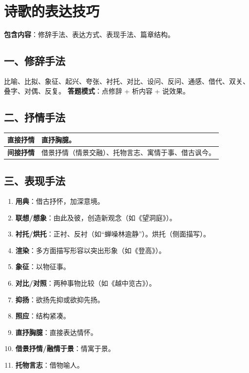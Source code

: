 \documentclass[11pt,a4paper]{article}
\begin{document}
\section{诗歌的表达技巧}

\textbf{包含内容}：修辞手法、表达方式、表现手法、篇章结构。

\subsection{一、修辞手法}
比喻、比拟、象征、起兴、夸张、衬托、对比、设问、反问、通感、借代、双关、叠字、对偶、反复。
\textbf{答题模式}：点修辞 + 析内容 + 说效果。

\subsection{二、抒情手法}
\begin{tcolorbox}[colback=white, colframe=black!50]
\begin{tabularx}{\textwidth}{@{}lX@{}}
\textbf{直接抒情} & 直抒胸臆。 \\ \midrule
\textbf{间接抒情} & 借景抒情（情景交融）、托物言志、寓情于事、借古讽今。 \\
\end{tabularx}
\end{tcolorbox}

\subsection{三、表现手法}
\begin{enumerate}
    \item \textbf{用典}：借古抒怀，加深意境。
    \item \textbf{联想/想象}：由此及彼，创造新观念（如《望洞庭》）。
    \item \textbf{衬托/烘托}：正衬、反衬（如“蝉噪林逾静”）。烘托（侧面描写）。
    \item \textbf{渲染}：多方面描写形容以突出形象（如《登高》）。
    \item \textbf{象征}：以物征事。
    \item \textbf{对比/对照}：两种事物比较（如《越中览古》）。
    \item \textbf{抑扬}：欲扬先抑或欲抑先扬。
    \item \textbf{照应}：结构紧凑。
    \item \textbf{直抒胸臆}：直接表达情怀。
    \item \textbf{借景抒情/融情于景}：情寓于景。
    \item \textbf{托物言志}：借物喻人。
\end{enumerate}
\end{document}
